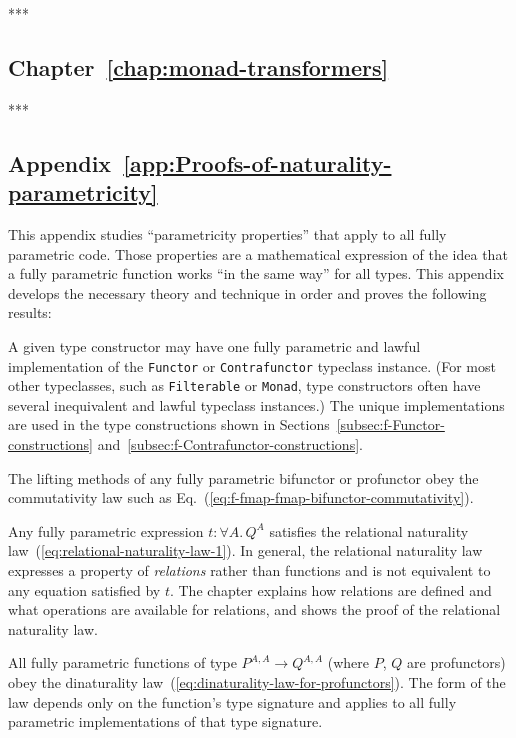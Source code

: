 {*}{*}{*}

\subsection{Chapter~\ref{chap:monad-transformers}}

{*}{*}{*}

\subsection{Appendix~\ref{app:Proofs-of-naturality-parametricity}}

This appendix studies \textsf{``}parametricity properties\textsf{''} that apply to
all fully parametric code. Those properties are a mathematical expression
of the idea that a fully parametric function works \textsf{``}in the same
way\textsf{''} for all types. This appendix develops the necessary theory
and technique in order and proves the following results:

A given type constructor may have one fully parametric and lawful
implementation of the \lstinline!Functor! or \lstinline!Contrafunctor!
typeclass instance. (For most other typeclasses, such as \lstinline!Filterable!
or \lstinline!Monad!, type constructors often have several inequivalent
and lawful typeclass instances.) The unique implementations are used
in the type constructions shown in Sections~\ref{subsec:f-Functor-constructions}
and~\ref{subsec:f-Contrafunctor-constructions}.

The lifting methods of any fully parametric bifunctor or profunctor
obey the commutativity law such as Eq.~(\ref{eq:f-fmap-fmap-bifunctor-commutativity}). 

Any fully parametric expression $t:\forall A.\,Q^{A}$ satisfies the
relational naturality law~(\ref{eq:relational-naturality-law-1}).
In general, the relational naturality law expresses a property of
\emph{relations} rather than functions and is not equivalent to any
equation satisfied by $t$. The chapter explains how relations are
defined and what operations are available for relations, and shows
the proof of the relational naturality law.

All fully parametric functions of type $P^{A,A}\rightarrow Q^{A,A}$
(where $P$, $Q$ are profunctors) obey the dinaturality law~(\ref{eq:dinaturality-law-for-profunctors}).
The form of the law depends only on the function\textsf{'}s type signature
and applies to all fully parametric implementations of that type signature.

